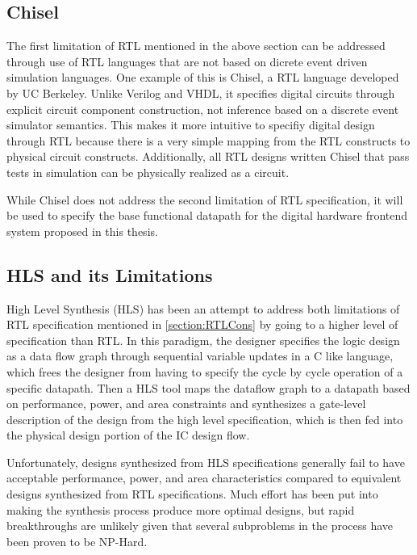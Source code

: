 \subsection{Chisel}
The first limitation of RTL mentioned in the above section can be addressed through use of RTL languages that are not based on dicrete event driven simulation languages. One example of this is Chisel\cite{Bachrach:2012}, a RTL language developed by UC Berkeley. Unlike Verilog and VHDL, it specifies digital circuits through explicit circuit component construction, not inference based on a discrete event simulator semantics. This makes it more intuitive to specifiy digital design through RTL because there is a very simple mapping from the RTL constructs to physical circuit constructs. Additionally, all RTL designs written Chisel that pass tests in simulation can be physically realized as a circuit.

While Chisel does not address the second limitation of RTL specification, it will be used to specify the base functional datapath for the digital hardware frontend system proposed in this thesis.

\subsection{HLS and its Limitations}
High Level Synthesis (HLS) has been an attempt to address both limitations of RTL specification mentioned in \ref{section:RTLCons} by going to a higher level of specification than RTL. In this paradigm, the designer specifies the logic design as a data flow graph through sequential variable updates in a C like language, which frees the designer from having to specify the cycle by cycle operation of a specific datapath. Then a HLS tool maps the dataflow graph to a datapath based on performance, power, and area constraints and synthesizes a gate-level description of the design from the high level specification, which is then fed into the physical design portion of the IC design flow. 

Unfortunately, designs synthesized from HLS specifications generally fail to have acceptable performance, power, and area characteristics compared to equivalent designs synthesized from RTL specifications. Much effort has been put into making the synthesis process produce more optimal designs, but rapid breakthroughs are unlikely given that several subproblems in the process have been proven to be NP-Hard\cite{McFarlan:1990}.
